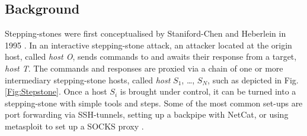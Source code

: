 \documentclass[runningheads,11pt]{llncs}\usepackage[]{graphicx}\usepackage[]{color}
\begin{document}
\subsection{Background}


 
Stepping-stones were first conceptualised by Staniford-Chen and Heberlein in 1995 \cite{staniford1995holding}. In an interactive stepping-stone attack, an attacker located at the origin host, called \textit{host O}, sends commands to and awaits their response from a target, \textit{host T}. The commands and responses are proxied via a chain of one or more intermediary stepping-stone hosts, called \textit{host} $S_1$, \dots, $S_N$, such as depicted in Fig. \ref{Fig:Stepstone}. 
Once a host $S_i$ is brought under control, it can be turned into a stepping-stone with simple tools and steps. Some of the most common set-ups are port forwarding via SSH-tunnels, setting up a backpipe with NetCat, or using metasploit to set up a SOCKS proxy \cite{pivoting2015}.

\end{document}
